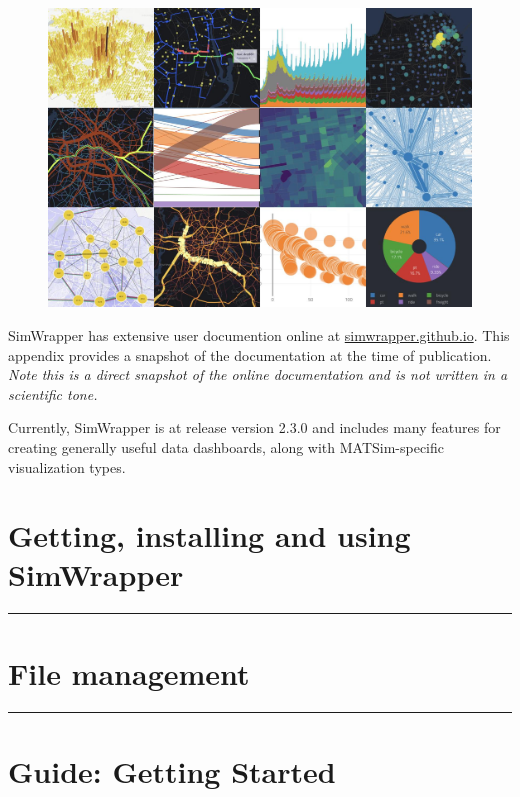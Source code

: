 \begin{figure}[H]
  \centering
  \includegraphics[width=\textwidth]{assets/simwrapper-scrnshot-collage.jpg}
\end{figure}

SimWrapper has extensive user documention online at \url{simwrapper.github.io}. This appendix provides a snapshot of the documentation at the time of publication. \emph{Note this is a direct snapshot of the online documentation and is not written in a scientific tone.}

Currently, SimWrapper is at release version 2.3.0 and includes many features for creating generally useful data dashboards, along with MATSim-specific visualization types.

\section{Getting, installing and using SimWrapper}


\begin{center}\rule{0.5\linewidth}{0.5pt}\end{center}
\section{File management}



\begin{center}\rule{0.5\linewidth}{0.5pt}\end{center}
\section{Guide: Getting Started}


